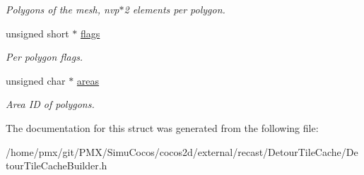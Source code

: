 \begin{DoxyCompactItemize}
\begin{DoxyCompactList}\small\item\em Polygons of the mesh, nvp$\ast$2 elements per polygon. \end{DoxyCompactList}\item 
\mbox{\label{structdtTileCachePolyMesh_a2ae667079123711b96b49ab3dfef87a1}} 
unsigned short $\ast$ \hyperlink{structdtTileCachePolyMesh_a2ae667079123711b96b49ab3dfef87a1}{flags}
\begin{DoxyCompactList}\small\item\em Per polygon flags. \end{DoxyCompactList}\item 
\mbox{\label{structdtTileCachePolyMesh_a16d0246d0e33f2a89cd3d68a41fd0937}} 
unsigned char $\ast$ \hyperlink{structdtTileCachePolyMesh_a16d0246d0e33f2a89cd3d68a41fd0937}{areas}
\begin{DoxyCompactList}\small\item\em Area ID of polygons. \end{DoxyCompactList}\end{DoxyCompactItemize}


The documentation for this struct was generated from the following file\+:\begin{DoxyCompactItemize}
\item 
/home/pmx/git/\+P\+M\+X/\+Simu\+Cocos/cocos2d/external/recast/\+Detour\+Tile\+Cache/Detour\+Tile\+Cache\+Builder.\+h\end{DoxyCompactItemize}
